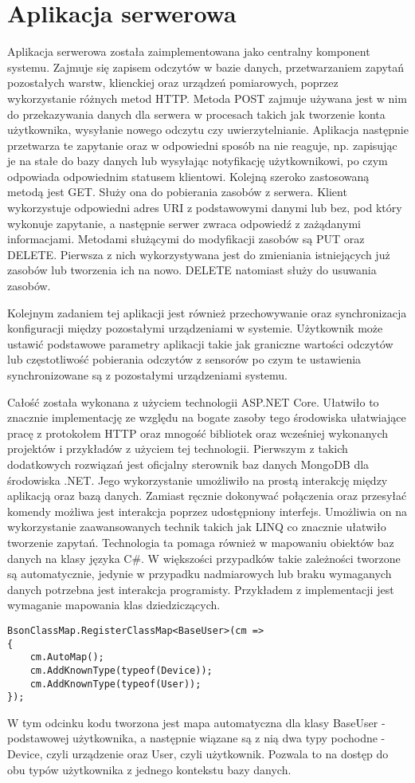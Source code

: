 \section{Aplikacja serwerowa}
Aplikacja serwerowa została zaimplementowana jako centralny komponent systemu.
Zajmuje się zapisem odczytów w bazie danych, przetwarzaniem zapytań
pozostałych warstw, klienckiej oraz urządzeń pomiarowych,
poprzez wykorzystanie różnych metod HTTP.
Metoda POST zajmuje używana jest w nim do przekazywania danych
dla serwera w procesach takich jak tworzenie konta użytkownika,
wysyłanie nowego odczytu czy uwierzytelnianie.
Aplikacja następnie przetwarza te zapytanie oraz w odpowiedni 
sposób na nie reaguje, np. zapisując je na stałe do bazy danych 
lub wysyłając notyfikację użytkownikowi, po czym odpowiada
odpowiednim statusem klientowi.
Kolejną szeroko zastosowaną metodą jest GET. Służy ona do pobierania
zasobów z serwera. Klient wykorzystuje odpowiedni adres URI z
podstawowymi danymi lub bez, pod który wykonuje zapytanie, a
następnie serwer zwraca odpowiedź z zażądanymi informacjami.
Metodami służącymi do modyfikacji zasobów są PUT oraz DELETE.
Pierwsza z nich wykorzystywana jest do zmieniania istniejących
już zasobów lub tworzenia ich na nowo. DELETE natomiast służy
do usuwania zasobów.

Kolejnym zadaniem tej aplikacji jest również przechowywanie oraz synchronizacja konfiguracji
między pozostałymi urządzeniami w systemie. Użytkownik może ustawić podstawowe
parametry aplikacji takie jak graniczne wartości odczytów lub
częstotliwość pobierania odczytów z sensorów po czym te ustawienia
synchronizowane są z pozostałymi urządzeniami systemu.

Całość została wykonana z użyciem technologii ASP.NET Core.
Ułatwiło to znacznie implementację ze względu na bogate zasoby
tego środowiska ułatwiające pracę z protokołem HTTP oraz mnogość
bibliotek oraz wcześniej wykonanych projektów i przykładów z użyciem
tej technologii. 
Pierwszym z takich dodatkowych rozwiązań jest oficjalny sterownik
baz danych MongoDB dla środowiska .NET. Jego wykorzystanie 
umożliwiło na prostą interakcję między aplikacją oraz bazą
danych. Zamiast ręcznie dokonywać połączenia oraz przesyłać
komendy możliwa jest interakcja poprzez udostępniony interfejs.
Umożliwia on na wykorzystanie zaawansowanych technik takich jak
LINQ co znacznie ułatwiło tworzenie zapytań. Technologia ta
pomaga również w mapowaniu obiektów baz danych na klasy języka C\#.
W większości przypadków takie zależności tworzone są automatycznie,
jedynie w przypadku nadmiarowych lub braku wymaganych danych potrzebna
jest interakcja programisty. Przykładem z implementacji jest wymaganie
mapowania klas dziedziczących.
\begin{lstlisting}[language={[Sharp]C}]
BsonClassMap.RegisterClassMap<BaseUser>(cm =>
{
    cm.AutoMap();
    cm.AddKnownType(typeof(Device));
    cm.AddKnownType(typeof(User));
});
\end{lstlisting}
W tym odcinku kodu tworzona jest mapa automatyczna dla klasy BaseUser - podstawowej
użytkownika, a następnie wiązane są z nią dwa typy pochodne - Device, czyli urządzenie
oraz User, czyli użytkownik. Pozwala to na dostęp do obu typów użytkownika
z jednego kontekstu bazy danych.

